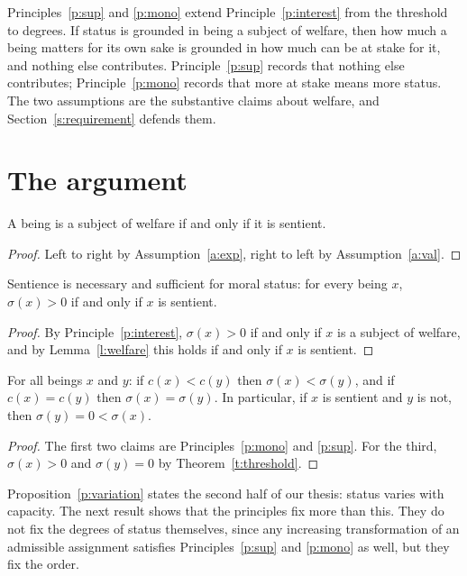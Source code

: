 \documentclass{situationist-preprint}
\begin{document}
Principles~\ref{p:sup} and \ref{p:mono} extend Principle~\ref{p:interest} from the threshold to degrees. If status is grounded in being a subject of welfare, then how much a being matters for its own sake is grounded in how much can be at stake for it, and nothing else contributes. Principle~\ref{p:sup} records that nothing else contributes; Principle~\ref{p:mono} records that more at stake means more status. The two assumptions are the substantive claims about welfare, and Section~\ref{s:requirement} defends them.

\section{The argument}\label{s:argument}

\begin{lemma}\label{l:welfare}
A being is a subject of welfare if and only if it is sentient.
\end{lemma}

\begin{proof}
Left to right by Assumption~\ref{a:exp}, right to left by Assumption~\ref{a:val}.
\end{proof}

\begin{theorem}[Threshold]\label{t:threshold}
Sentience is necessary and sufficient for moral status: for every being $x$, $\sigma(x) > 0$ if and only if $x$ is sentient.
\end{theorem}

\begin{proof}
By Principle~\ref{p:interest}, $\sigma(x) > 0$ if and only if $x$ is a subject of welfare, and by Lemma~\ref{l:welfare} this holds if and only if $x$ is sentient.
\end{proof}

\begin{proposition}[Variation]\label{p:variation}
For all beings $x$ and $y$: if $c(x) < c(y)$ then $\sigma(x) < \sigma(y)$, and if $c(x) = c(y)$ then $\sigma(x) = \sigma(y)$. In particular, if $x$ is sentient and $y$ is not, then $\sigma(y) = 0 < \sigma(x)$.
\end{proposition}

\begin{proof}
The first two claims are Principles~\ref{p:mono} and \ref{p:sup}. For the third, $\sigma(x) > 0$ and $\sigma(y) = 0$ by Theorem~\ref{t:threshold}.
\end{proof}

Proposition~\ref{p:variation} states the second half of our thesis: status varies with capacity. The next result shows that the principles fix more than this. They do not fix the degrees of status themselves, since any increasing transformation of an admissible assignment satisfies Principles~\ref{p:sup} and \ref{p:mono} as well, but they fix the order.
\end{document}
